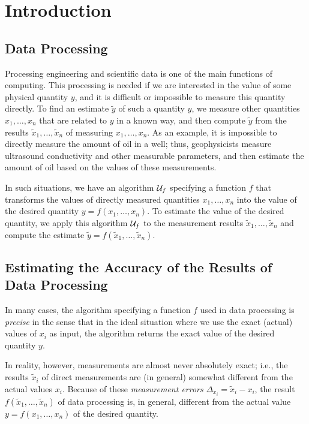 
\chapter{Introduction}

\section{Data Processing}

Processing engineering and scientific data is one of the main functions of 
computing.  This processing is needed if we are interested in the value of 
some physical quantity $y$, and it is difficult or impossible to
measure this quantity directly. To find an estimate $\tilde y$ of such a
quantity $y$, we measure other quantities $x_1,\ldots,x_n$ that are related
to $y$ in a known way, and then compute $\tilde y$ from the results $\tilde
x_1,\ldots,\tilde x_n$ of measuring $x_1,\ldots,x_n$. As an example, it
is impossible to directly measure the amount of oil in a well; thus,
geophysicists measure ultrasound conductivity and other measurable
parameters, and then estimate the amount of oil based on the values of
these measurements. 

In such situations, we have an algorithm ${\cal U}_f$ specifying a function $f$ 
that transforms the values of directly measured quantities $x_1,\ldots,x_n$ 
into the value of the desired quantity $y=f(x_1,\ldots,x_n)$.
To estimate the value of the desired quantity, we apply this algorithm 
${\cal U}_f$ to the measurement results $\tilde x_1,\ldots,\tilde x_n$ and 
compute the estimate $\tilde y=f(\tilde x_1,\ldots,\tilde x_n)$. 

\section{Estimating the Accuracy of the Results of Data Processing}

In many cases, the algorithm specifying a function $f$ used in data
processing is {\it precise} in the sense that in the ideal situation
where we use the exact (actual) values of $x_i$ as input, the algorithm
returns the exact value of the desired quantity $y$.

In reality, however, measurements are almost never absolutely exact; i.e.,
the results $\tilde x_i$ of direct measurements are (in general) somewhat
different from the actual values $x_i$.  Because of these {\em measurement
errors\/} $\Delta_{x_i}=\tilde x_i-x_i$, the result
$f(\tilde x_1,\ldots,\tilde x_n)$ of data processing is, in general,
different from the actual value $y=f(x_1,\ldots,x_n)$ of the desired quantity.

